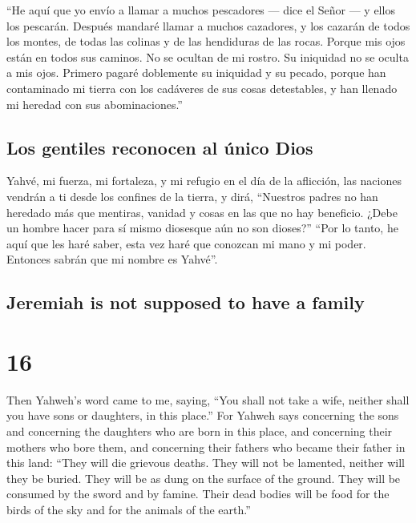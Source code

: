 \begin{paracol}{2}
 ``He aquí que yo envío a llamar a muchos pescadores ---
dice el Señor --- y ellos los pescarán. Después mandaré llamar a muchos
cazadores, y los cazarán de todos los montes, de todas las colinas y de
las hendiduras de las rocas.  Porque mis ojos están en
todos sus caminos. No se ocultan de mi rostro. Su iniquidad no se oculta
a mis ojos.  Primero pagaré doblemente su iniquidad y su
pecado, porque han contaminado mi tierra con los cadáveres de sus cosas
detestables, y han llenado mi heredad con sus abominaciones.''

\hypertarget{los-gentiles-reconocen-al-uxfanico-dios}{%
\subsection{Los gentiles reconocen al único
Dios}\label{los-gentiles-reconocen-al-uxfanico-dios}}

 Yahvé, mi fuerza, mi fortaleza, y mi refugio en el día
de la aflicción, las naciones vendrán a ti desde los confines de la
tierra, y dirá, ``Nuestros padres no han heredado más que mentiras,
vanidad y cosas en las que no hay beneficio.  ¿Debe un
hombre hacer para sí mismo diosesque aún no son dioses?''
 ``Por lo tanto, he aquí que les haré saber, esta vez
haré que conozcan mi mano y mi poder. Entonces sabrán que mi nombre es
Yahvé''.

\switchcolumn
\begin{otherlanguage}{english}

\hypertarget{jeremiah-is-not-supposed-to-have-a-family}{%
\subsection{Jeremiah is not supposed to have a
family}\label{jeremiah-is-not-supposed-to-have-a-family}}

\hypertarget{section-31}{%
\section{16}\label{section-31}}

 Then Yahweh's word came to me, saying, 
``You shall not take a wife, neither shall you have sons or daughters,
in this place.''  For Yahweh says concerning the sons and
concerning the daughters who are born in this place, and concerning
their mothers who bore them, and concerning their fathers who became
their father in this land:  ``They will die grievous
deaths. They will not be lamented, neither will they be buried. They
will be as dung on the surface of the ground. They will be consumed by
the sword and by famine. Their dead bodies will be food for the birds of
the sky and for the animals of the earth.''


\end{otherlanguage}
\end{paracol}
